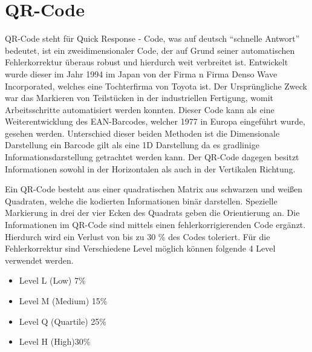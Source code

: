\documentclass[12pt,					%
							 oneside,			%
							 a4paper,			%
							 halfparskip,		%
							 liststotoc,			%
							 bibtotoc,			%
							 fleqn,				%
							 pointlessnumbers]	%
							 {scrreprt}
\begin{document}
\section{QR-Code}
QR-Code steht für Quick Response - Code, was auf deutsch ``schnelle Antwort'' bedeutet, ist ein zweidimensionaler Code, der auf Grund seiner automatischen Fehlerkorrektur überaus robust und hierdurch weit verbreitet ist. 
Entwickelt wurde dieser im Jahr 1994 im Japan von der Firma n Firma Denso Wave Incorporated, welches eine Tochterfirma von Toyota ist. Der Ursprüngliche Zweck war das Markieren von Teilstücken in der industriellen Fertigung, womit Arbeitsschritte automatisiert werden konnten. Dieser Code kann als eine Weiterentwicklung des EAN-Barcodes, welcher 1977 in Europa eingeführt wurde, gesehen werden. Unterschied dieser beiden Methoden ist die Dimensionale Darstellung ein Barcode gilt als eine 1D Darstellung da es gradlinige Informationsdarstellung getrachtet werden kann. Der QR-Code dagegen besitzt Informationen sowohl in der Horizontalen als auch in der Vertikalen Richtung.


Ein QR-Code besteht aus einer quadratischen Matrix aus schwarzen und weißen Quadraten, welche die kodierten Informationen binär darstellen. Spezielle Markierung in drei der vier Ecken des Quadrats geben die Orientierung an. Die Informationen im QR-Code sind mittels einen fehlerkorrigierenden Code ergänzt. Hierdurch wird ein Verlust von bis zu 30 \% des Codes toleriert. Für die Fehlerkorrektur sind Verschiedene Level möglich können folgende 4 Level verwendet werden.
\begin{itemize}
\item Level L (Low) 7\%
\item Level M (Medium) 15\%
\item Level Q (Quartile) 25\% 
\item Level H (High)30\% 
\end{itemize}
\end{document}
